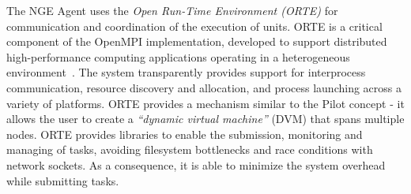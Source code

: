 The NGE Agent uses the \emph{Open Run-Time Environment (ORTE)} for
communication and coordination of the execution of units. ORTE is a critical
component of the OpenMPI implementation, developed to support distributed
high-performance computing applications operating in a heterogeneous
environment~\cite{XXX}. The system  transparently provides support for interprocess communication,
resource discovery and allocation, and process launching across a variety of
platforms. ORTE provides a mechanism similar to the Pilot concept - it allows
the user to create a \emph{``dynamic virtual machine''} (DVM) that spans
multiple nodes. ORTE provides libraries to enable the submission, monitoring
and managing of tasks, avoiding filesystem bottlenecks and race conditions
with network sockets. As a consequence, it is able to minimize the system
overhead while submitting tasks.

%


